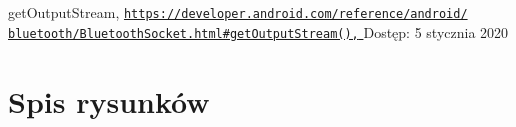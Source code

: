 \documentclass[a4paper,12pt, twoside]{article}
\begin{document}
\begin{thebibliography}{}
    		getOutputStream,
    		\newline\href{https://developer.android.com/reference/android/bluetooth/BluetoothSocket.html\#getOutputStream()}
    		 {\nolinkurl{https://developer.android.com/reference/android/}
                 \\
                  \nolinkurl{bluetooth/BluetoothSocket.html\#getOutputStream(),}
                 }
    		\newline Dostęp: 5 stycznia 2020
    		
    	\end{thebibliography}
    	\endgroup
    	
    	\newpage
    	\section{Spis rysunków}
    	\begingroup
    	\renewcommand{\section}[2]{}%
    	\listoffigures
    	\endgroup
    	
    	\newpage
    	\section{Spis algorytmów}
    	\begingroup
    	\renewcommand{\section}[2]{}%
    	\lstlistoflistings
    	\renewcommand{\section}[2]{}%
    	\endgroup
    	
    
\end{document}
